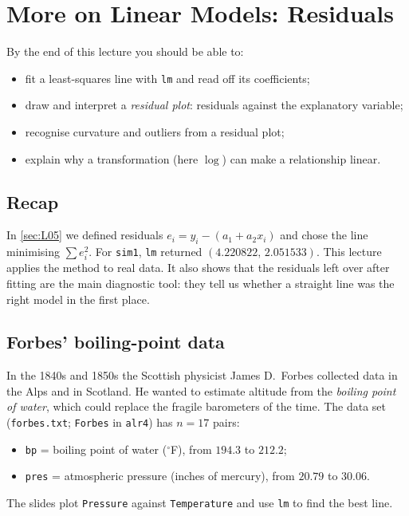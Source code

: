 \section{More on Linear Models: Residuals}\label{sec:L06}


\begin{guiding*}
By the end of this lecture you should be able to:
\begin{itemize}
  \item fit a least-squares line with \texttt{lm} and read off its coefficients;
  \item draw and interpret a \emph{residual plot}: residuals against the explanatory variable;
  \item recognise curvature and outliers from a residual plot;
  \item explain why a transformation (here $\log$) can make a relationship linear.
\end{itemize}
\end{guiding*}

\subsection{Recap}
In \cref{sec:L05} we defined residuals $e_i=y_i-(a_1+a_2x_i)$ and chose the line minimising
$\sum e_i^2$. For \texttt{sim1}, \texttt{lm} returned $(4.220822,\,2.051533)$. This lecture
applies the method to real data. It also shows that the residuals left over after fitting are
the main diagnostic tool: they tell us whether a straight line was the right model in the first
place.

\subsection{Forbes' boiling-point data}
\begin{example}[Forbes, 1857]\label{ex:L06-forbes}
In the 1840s and 1850s the Scottish physicist James D.~Forbes collected data in the Alps and in
Scotland. He wanted to estimate altitude from the \emph{boiling point of water}, which could
replace the fragile barometers of the time. The data set (\texttt{forbes.txt}; \texttt{Forbes}
in \texttt{alr4}) has $n=17$ pairs:
\begin{itemize}
  \item \texttt{bp} = boiling point of water ($^\circ$F), from $194.3$ to $212.2$;
  \item \texttt{pres} = atmospheric pressure (inches of mercury), from $20.79$ to $30.06$.
\end{itemize}
The slides plot \texttt{Pressure} against \texttt{Temperature} and use \texttt{lm} to find the
best line.
\end{example}

